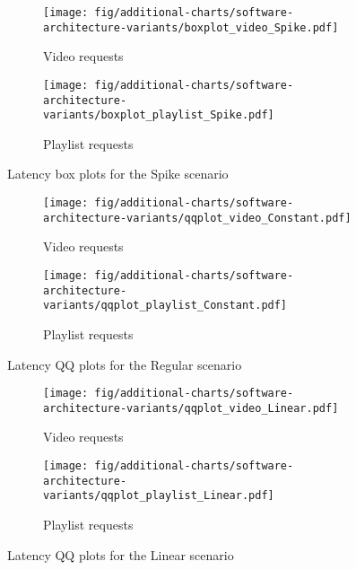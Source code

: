 \begin{figure}[h]
	\centering
	\begin{subfigure}[b]{0.8\textwidth}
		\centering
		\texttt{[image: fig/additional-charts/software-architecture-variants/boxplot\_video\_Spike.pdf]}
		\caption{Video requests}
		\label{fig:additional-charts--video-spike}
	\end{subfigure}
	\begin{subfigure}[b]{0.8\textwidth}
		\centering
		\texttt{[image: fig/additional-charts/software-architecture-variants/boxplot\_playlist\_Spike.pdf]}
		\caption{Playlist requests}
		\label{fig:additional-charts--playlist-spike}
	\end{subfigure}
	\caption{Latency box plots for the Spike scenario}
	\label{fig:additional-charts--spike}
\end{figure}

\begin{landscape}
	\begin{figure}[p]
		\centering
		\begin{subfigure}[b]{0.7\columnwidth}
			\centering
			\texttt{[image: fig/additional-charts/software-architecture-variants/qqplot\_video\_Constant.pdf]}
			\caption{Video requests}
			\label{fig:additional-charts--qqplot-video-regular}
			\vspace{0.75cm}
		\end{subfigure}
		\begin{subfigure}[b]{0.7\columnwidth}
			\centering
			\texttt{[image: fig/additional-charts/software-architecture-variants/qqplot\_playlist\_Constant.pdf]}
			\caption{Playlist requests}
			\label{fig:additional-charts--qqplot-playlist-regular}
		\end{subfigure}
		\caption{Latency QQ plots for the Regular scenario}
		\label{fig:additional-charts--qqplot-regular}
	\end{figure}
\end{landscape}

\begin{landscape}
	\begin{figure}[p]
		\centering
		\begin{subfigure}[b]{0.7\columnwidth}
			\centering
			\texttt{[image: fig/additional-charts/software-architecture-variants/qqplot\_video\_Linear.pdf]}
			\caption{Video requests}
			\label{fig:additional-charts--qqplot-video-linear}
			\vspace{0.75cm}
		\end{subfigure}
		\begin{subfigure}[b]{0.7\columnwidth}
			\centering
			\texttt{[image: fig/additional-charts/software-architecture-variants/qqplot\_playlist\_Linear.pdf]}
			\caption{Playlist requests}
			\label{fig:additional-charts--qqplot-playlist-linear}
		\end{subfigure}
		\caption{Latency QQ plots for the Linear scenario}
		\label{fig:additional-charts--qqplot-linear}
	\end{figure}
\end{landscape}

